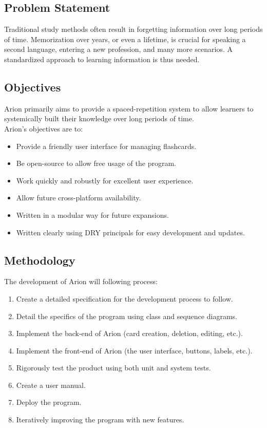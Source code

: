 \documentclass{scrreprt}
\begin{document}
\subsection{Problem Statement}
Traditional study methods often result in forgetting information over long periods of time.
Memorization over years, or even a lifetime, is crucial for
speaking a second language, entering a new profession, and many more scenarios.
A standardized approach to learning information is thus needed.

\subsection{Objectives}
Arion primarily aims to provide a spaced-repetition system to allow learners to 
systemically built their knowledge over long periods of time. \\
Arion's objectives are to:
\begin{itemize}
    \item Provide a friendly user interface for managing flashcards.
    \item Be open-source to allow free usage of the program.
    \item Work quickly and robustly for excellent user experience.
    \item Allow future cross-platform availability.
    \item Written in a modular way for future expansions.
    \item Written clearly using DRY principals for easy development and updates.
\end{itemize}

\subsection{Methodology}
The development of Arion will following process:
\begin{enumerate}[1.]
    \item Create a detailed specification for the development process to follow.
    \item Detail the specifics of the program using class and sequence diagrams.
    \item Implement the back-end of Arion (card creation, deletion, editing, etc.).
    \item Implement the front-end of Arion (the user interface, buttons, labels, etc.).
    \item Rigorously test the product using both unit and system tests.
    \item Create a user manual.
    \item Deploy the program.
    \item Iteratively improving the program with new features.
\end{enumerate}
\end{document}
